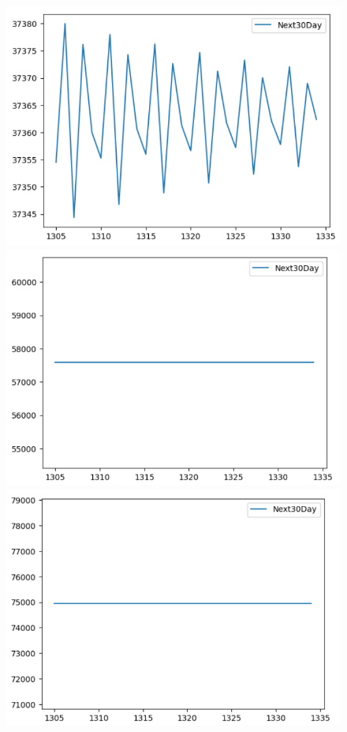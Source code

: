 \begin{figure}[H]
\begin{minipage}{0.15\textwidth}
    \centering
    \includegraphics[width=1\textwidth]{resources/chapter-5/newdata/predicted/BIDV_ARIMA_9-1_30days.png}
    \end{minipage}
    \hfill
    \begin{minipage}{0.15\textwidth}
    \centering
    \includegraphics[width=1\textwidth]{resources/chapter-5/newdata/predicted/VCB_ARIMA_7-3_30days.png}
    \end{minipage}
    \hfill
    \begin{minipage}{0.15\textwidth}
    \centering
    \includegraphics[width=1\textwidth]{resources/chapter-5/newdata/predicted/VCB_ARIMA_8-2_30days.png}

\end{minipage}
\end{figure}
